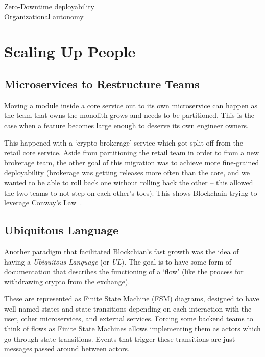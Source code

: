 \documentclass[conference]{IEEEtran}
\begin{document}
    Zero-Downtime deployability\\
    Organizational autonomy


    \section{Scaling Up People}

    \subsection{Microservices to Restructure Teams}

    Moving a module inside a core service out to its own microservice can happen as the team that
    owns the monolith grows and needs to be partitioned.
    This is the case when a feature becomes large enough to deserve its own engineer owners.

    This happened with a `crypto brokerage' service which got split off from the retail core
    service.
    Aside from partitioning the retail team in order to from a new brokerage team, the other goal of
    this migration was to achieve more fine-grained deployability (brokerage was getting releases
    more often than the core, and we wanted to be able to roll back one without rolling back the
    other -- this allowed the two teams to not step on each other's toes).
    This shows Blockchain trying to leverage Conway's Law~\cite{conwayLaw}.\\

    \subsection{Ubiquitous Language}

    Another paradigm that facilitated Blockchian's fast growth was the idea of having a
    \emph{Ubiquitous Language} (or \emph{UL}).
    The goal is to have some form of documentation that describes the functioning of a `flow' (like
    the process for withdrawing crypto from the exchange).

    These are represented as Finite State Machine (FSM) diagrams, designed to have well-named states and
    state transitions depending on each interaction with the user, other microservices, and external
    services.
    Forcing some backend teams to think of flows as Finite State Machines allows implementing
    them as actors which go through state transitions.
    Events that trigger these transitions are just messages passed around between actors.
\end{document}
